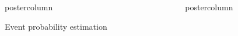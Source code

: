 \documentclass[final,hyperref={pdfpagelabels=false}]{beamer}
\begin{document}
\begin{frame}
\begin{columns}
\begin{column}{1\textwidth}
\begin{columns}[T]
\begin{column}{.484\textwidth}
\begin{beamercolorbox}[center,wd=\textwidth]{postercolumn}
\begin{minipage}[T]{.95\textwidth}
\begin{block}{\footnotesize Event probability estimation}
%
%
%
\end{block}



\end{minipage}
\end{beamercolorbox}
\end{column}

\begin{column}{.484\textwidth}
\begin{beamercolorbox}[center,wd=\textwidth]{postercolumn}
\begin{minipage}[T]{.95\textwidth}  %



\end{minipage}
\end{beamercolorbox}
\end{column}
\end{columns}
\end{column}
\end{columns}
\end{frame}
\end{document}
